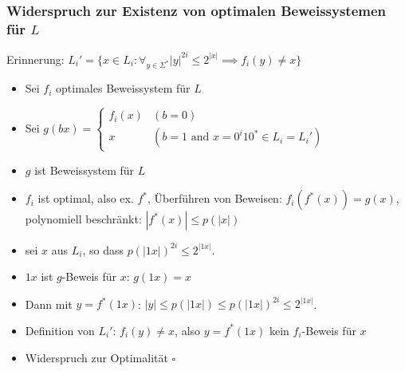 \begin{frame}
  \frametitle{Widerspruch zur Existenz von optimalen Beweissystemen für \(L\)}

  Erinnerung: \(L_i' = \{ x \in L_i : \forall_{y \in \Sigma^*} |y|^{2i} \leq 2^{|x|} \implies f_i(y) \neq x \}\)

  \begin{itemize}
   \item<1-> Sei \(f_i\) optimales Beweissystem für \(L\)
   \item<2-> Sei
         \(g(bx) =
           \begin{cases}
             f_i(x) & (b=0) \\
             x      & (b = 1 \text{ and } x=0^i10^* \in L_i = L_i') 
           \end{cases}\)
   \item<3-> \(g\) ist Beweissystem für \(L\)
   \item<4-> \(f_i\) ist optimal, also ex. \(f^*\), Überführen von Beweisen: \(f_i(f^*(x)) = g(x)\), polynomiell beschränkt: \(|f^*(x)| \leq p(|x|)\)
   \item<5-> sei \(x\) aus \(L_i\), so dass \(p(|1x|)^{2i} \leq 2^{|1x|}\).
   \item<6-> \(1x\) ist \(g\)-Beweis für \(x\): \(g(1x) = x\)
   \item<7-> Dann mit \(y = f^*(1x)\): \(|y| \leq p(|1x|) \leq p(|1x|)^{2i} \leq 2^{|1x|}\).
   \item<8-> Definition von \(L_i'\): \(f_i(y) \neq x\), also \(y = f^*(1x)\) kein \(f_i\)-Beweis für \(x\)
   \item<9-> Widerspruch zur Optimalität  \(\square\)
  \end{itemize}

\end{frame}


